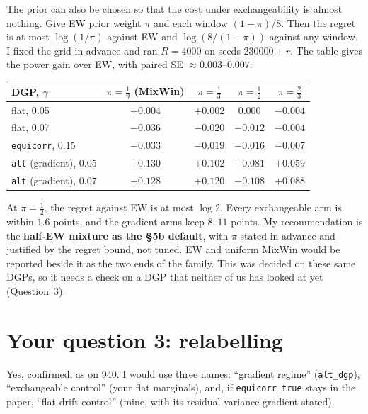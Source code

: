 \documentclass[11pt]{article}
\begin{document}
The prior can also be chosen so that the cost under exchangeability is almost nothing. Give EW prior weight $\pi$ and each window $(1-\pi)/8$. Then the regret is at most $\log(1/\pi)$ against EW and $\log(8/(1-\pi))$ against any window. I fixed the grid in advance and ran $R=4000$ on seeds $230000+r$. The table gives the power gain over EW, with paired SE ${\approx}0.003$--$0.007$:
\begin{center}\small
\begin{tabular}{lcccc}
\toprule
DGP, $\gamma$ & $\pi=\frac19$ (MixWin) & $\pi=\frac13$ & $\pi=\frac12$ & $\pi=\frac23$\\
\midrule
flat, 0.05 & $+0.004$ & $+0.002$ & $0.000$ & $-0.004$\\
flat, 0.07 & $-0.036$ & $-0.020$ & $\mathbf{-0.012}$ & $-0.004$\\
\texttt{equicorr}, 0.15 & $-0.033$ & $-0.019$ & $\mathbf{-0.016}$ & $-0.007$\\
\texttt{alt} (gradient), 0.05 & $+0.130$ & $+0.102$ & $\mathbf{+0.081}$ & $+0.059$\\
\texttt{alt} (gradient), 0.07 & $+0.128$ & $+0.120$ & $\mathbf{+0.108}$ & $+0.088$\\
\bottomrule
\end{tabular}
\end{center}
At $\pi=\frac12$, the regret against EW is at most $\log2$. Every exchangeable arm is within $1.6$ points, and the gradient arms keep $8$--$11$ points.
My recommendation is the \textbf{half-EW mixture as the \S5b default}, with $\pi$ stated in advance and justified by the regret bound, not tuned. EW and uniform MixWin would be reported beside it as the two ends of the family.
This was decided on these same DGPs, so it needs a check on a DGP that neither of us has looked at yet (Question~3).

\section{Your question 3: relabelling}
Yes, confirmed, as on 940. I would use three names: ``gradient regime'' (\texttt{alt\_dgp}), ``exchangeable control'' (your flat marginals), and, if \texttt{equicorr\_true} stays in the paper, ``flat-drift control'' (mine, with its residual variance gradient stated).
\end{document}
